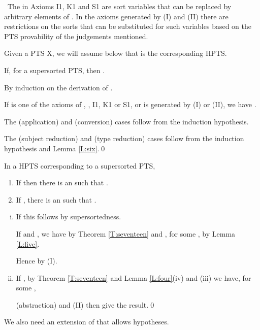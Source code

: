 \documentclass{LMCS}
\begin{document}
\begin{thm}
{\begin{defi}
\begin{enumerate}[(I)]
\end{enumerate}
\end{defi}

 \ The  in Axioms I1, K1 and S1 are
  sort variables that can be replaced by arbitrary elements of
  . In the axioms generated by (I) and (II) there are
  restrictions on the sorts that can be substituted for such variables
  based on the PTS provability of the judgements mentioned.

  Given a PTS X, we will assume below that  is
  the corresponding HPTS.

\begin{thm}\label{T:seventeen} If, for a supersorted PTS,  then .
\end{thm}

\proof By induction on the derivation of  .

  If  is one of the axioms of , , I1,
  K1 or S1, or is generated by (I) or (II), we have .

  The (application) and (conversion) cases follow from the induction
  hypothesis.

  The (subject reduction) and (type reduction) cases follow from the
  induction hypothesis and Lemma \ref{L:six}.\qed

\begin{lem}\label{L:eighteen} In a HPTS corresponding to a supersorted PTS,
\begin{enumerate}[\em(i)]
\item If  then there is an  such that .
\item If , there is an 
  such that .
\end{enumerate}
\end{lem}

\proof\hfill

\begin{enumerate}[(i)]
\item If  this follows by supersortedness.

  \noindent If  and , we have
   by Theorem \ref{T:seventeen} and , for
  some , by Lemma \ref{L:five}.

  \noindent Hence  by (I).

\item If , by Theorem \ref{T:seventeen} and Lemma
  \ref{L:four}(iv) and (iii) we have, for some ,

  (abstraction) and (II) then give the result.\qed
\end{enumerate}

 \noindent We also need an extension of  that allows hypotheses.

}
\end{thm}
\end{document}
